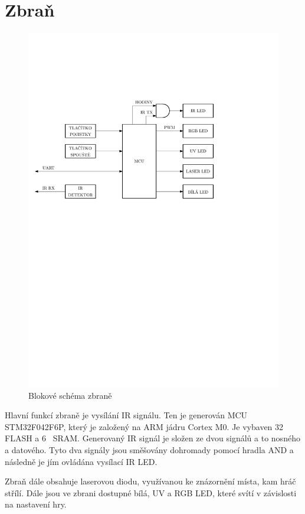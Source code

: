 \section{Zbraň}
\begin{figure}[H]
    \begin{center}
        \includegraphics[width=\textwidth]{img/gun}
    \end{center}
    \caption{Blokové schéma zbraně}
\end{figure}
Hlavní funkcí zbraně je vysílání IR signálu. Ten je generován MCU STM32F042F6P, který je založený na ARM jádru Cortex M0. Je vybaven 32~ FLASH a 6~ SRAM. Generovaný IR signál je složen ze dvou signálů a to nosného a datového. Tyto dva signály jsou směšovány dohromady pomocí hradla AND a následně je jím ovládána vysílací IR LED.

Zbraň dále obsahuje laserovou diodu, využívanou ke znázornění místa, kam hráč střílí. Dále jsou ve zbrani dostupné bílá, UV a RGB LED, které svítí v závislosti na nastavení hry.

